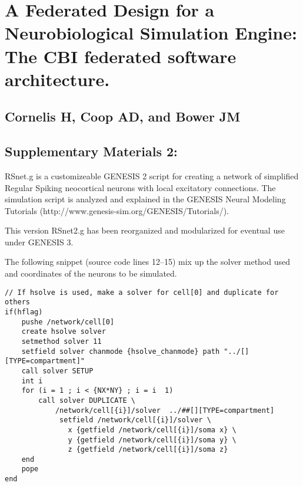 \documentclass[10pt]{article}
\begin{document}
\section*{A Federated Design for a Neurobiological Simulation Engine: 
The CBI federated software architecture.}
\subsection*{Cornelis H, Coop AD, and Bower JM}
\subsection*{Supplementary Materials 2:} 

RSnet.g is a customizeable GENESIS 2 script for creating a network of simplified
Regular Spiking neocortical neurons with local excitatory connections.
The simulation script is analyzed and explained in the GENESIS Neural
Modeling Tutorials (http://www.genesis-sim.org/GENESIS/Tutorials/).

This version RSnet2.g has been reorganized and modularized for
eventual use under GENESIS 3.

The following snippet (source code lines 12--15) mix up the solver
method used and coordinates of the neurons to be simulated.

\linenumbers
\begin{verbatim}
// If hsolve is used, make a solver for cell[0] and duplicate for others
if(hflag)
    pushe /network/cell[0]
    create hsolve solver
    setmethod solver 11 
    setfield solver chanmode {hsolve_chanmode} path "../[][TYPE=compartment]"
    call solver SETUP
    int i
    for (i = 1 ; i < {NX*NY} ; i = i  1)
        call solver DUPLICATE \
            /network/cell[{i}]/solver  ../##[][TYPE=compartment]
             setfield /network/cell[{i}]/solver \
               x {getfield /network/cell[{i}]/soma x} \
               y {getfield /network/cell[{i}]/soma y} \
               z {getfield /network/cell[{i}]/soma z}
    end
    pope
end
\end{verbatim}
\end{document}
